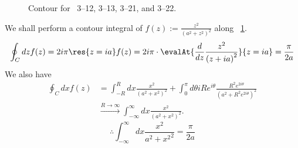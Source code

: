 \item

\begin{figure}[ht]
	\centering
	\caption{Contour for ~3--12, 3--13, 3--21, and 3--22.}%
	\label{fig:problem3-12}
\end{figure}

We shall perform a contour integral of $f(z) := \frac{z^2}{{\left( a^2 + z^2 \right)}^2}$ along ~\ref{fig:problem3-12}.
\[
	\oint_C dz f(z)
	= 2i\pi \res{z = ia} f(z)
	= 2i\pi \cdot \evalAt{\frac{d}{dz} \frac{z^2}{{\left( z + ia \right)}^2}}{z = ia}
	= \frac{\pi}{2a}
\]
We also have
\begin{align*}
	\oint_C dx f(z)
	 & = \int_{-R}^{R} dx \frac{x^2}{{\left( a^2 + x^2 \right)}^2}
	+\int_0^{\pi} d\theta iRe^{i\theta} \frac{R^2 e^{2i\theta}}{{\left( a^2 + R^2 e^{2i\theta} \right)}^2}     \\
	 & \xrightarrow{R \rightarrow \infty} \int_{-\infty}^{\infty} dx \frac{x^2}{{\left( a^2 + x^2 \right)}^2}.
\end{align*}
\[
	\therefore \int_{-\infty}^{\infty} dx \frac{x^2}{{a^2 + x^2}^2} = \frac{\pi}{2a}
\]